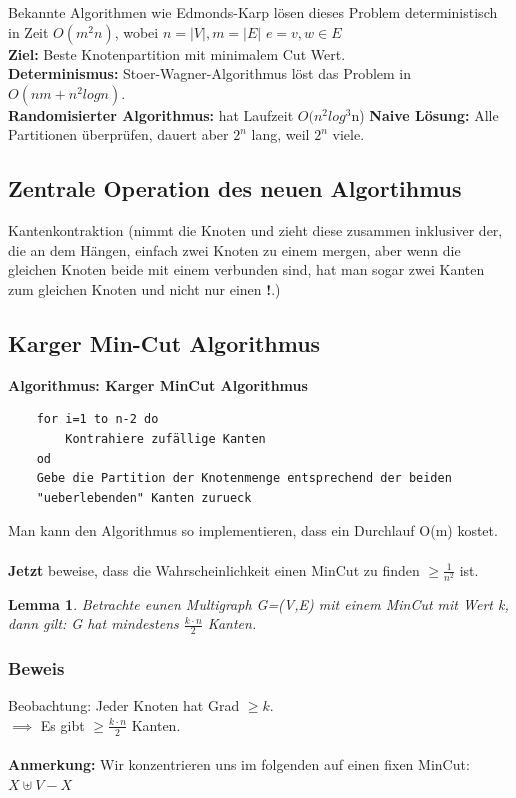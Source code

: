 \documentclass{article}
\newtheorem{lem}[thm]{Lemma}
\begin{document}
Bekannte Algorithmen wie Edmonds-Karp lösen dieses Problem deterministisch in Zeit $O(m^2n)$, wobei $n=|V|, m=|E|$ $e= v,w \in E$ \\
\textbf{Ziel: } Beste Knotenpartition mit minimalem Cut Wert. \\
\textbf{Determinismus:} Stoer-Wagner-Algorithmus löst das Problem in $O(nm + n^2 log n)$. \\
\textbf{Randomisierter Algorithmus: } hat Laufzeit $O(n^2 log^3$n) 
\textbf{Naive Lösung: } Alle Partitionen überprüfen, dauert aber $2^n$ lang, weil $2^n$ viele. \\
\subsection{Zentrale Operation des neuen Algortihmus}
Kantenkontraktion (nimmt die Knoten und zieht diese zusammen inklusiver der, die an dem Hängen, einfach zwei Knoten zu einem mergen, aber wenn die gleichen Knoten beide mit einem verbunden sind, hat man sogar zwei Kanten zum gleichen Knoten und nicht nur einen \textbf{!}.) \\
\subsection{Karger Min-Cut Algorithmus}

\textbf{Algorithmus: Karger MinCut Algorithmus}\\

\begin{verbatim}
    for i=1 to n-2 do
        Kontrahiere zufällige Kanten
    od
    Gebe die Partition der Knotenmenge entsprechend der beiden 
    "ueberlebenden" Kanten zurueck
\end{verbatim}
Man kann den Algorithmus so implementieren, dass ein Durchlauf O(m) kostet.\\
\\
\textbf{Jetzt} beweise, dass die Wahrscheinlichkeit einen MinCut zu finden $\geq \frac{1}{n^2}$ ist. 

\begin{lem}
    Betrachte eunen Multigraph G=(V,E) mit einem MinCut mit Wert k, dann gilt: G hat mindestens $\frac{k \cdot n}{2}$ Kanten.
\end{lem}

\subsubsection{Beweis}
Beobachtung: Jeder Knoten hat Grad $\geq k$.\\
$\implies$ Es gibt $\geq \frac{k \cdot n}{2}$ Kanten.\\
\\
\textbf{Anmerkung:} Wir konzentrieren uns im folgenden auf einen fixen MinCut: $X \uplus V - X$\\
\end{document}
